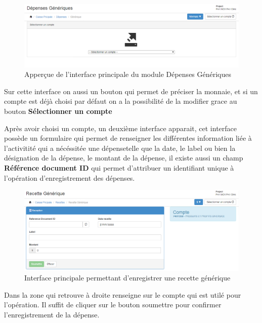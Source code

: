 \documentclass[12pt,a4paper]{report}
\begin{document}
\begin{figure}[h]
\begin{center}
\includegraphics[width=14cm]{pic/DepenseGen.png}
\end{center}
\caption{Apperçue de l'interface principale du module Dépenses Génériques}
\label{Apperçue de l'interface principale du module Dépenses Génériques}
\end{figure}

Sur cette interface on aussi un bouton qui permet de préciser la monnaie, et si un compte est déjà choisi par défaut on a la possibilité de la modifier grace au bouton \textbf{Sélectionner un compte}

\newpage
Après avoir choisi un compte, un deuxième interface apparait, cet interface possède un formulaire qui permet de renseigner les différentes information liée à l'activitité qui a nécéssitée une dépensetelle que la date, le label ou bien la désignation de la dépense, le montant de la dépense, il existe aussi un champ \textbf{Référence document ID} qui permet d'attribuer un identifiant unique à l'opération d'enregistrement des dépenses.

\begin{figure}[h]
\begin{center}
\includegraphics[width=14cm]{pic/recetteGen2.png}
\end{center}
\caption{Interface principale permettant d'enregistrer une recette générique}
\label{Interface principale permettant d'enregistrer une recette générique}
\end{figure}

Dans la zone qui retrouve à droite renseigne sur le compte qui est utilé pour l'opération. Il suffit de cliquer sur le bouton soumettre pour confirmer l'enregistrement de la dépense.
\end{document}
